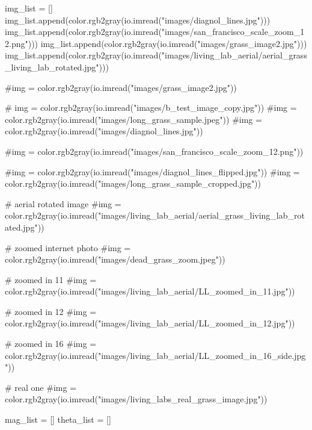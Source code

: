 \documentclass[
  letterpaper,
]{report}
\newenvironment{Shaded}{\begin{snugshade}}{\end{snugshade}}
\newcommand{\CommentTok}[1]{\textcolor[rgb]{0.37,0.37,0.37}{#1}}
\newcommand{\NormalTok}[1]{\textcolor[rgb]{0.00,0.23,0.31}{#1}}
\newcommand{\OperatorTok}[1]{\textcolor[rgb]{0.37,0.37,0.37}{#1}}
\newcommand{\StringTok}[1]{\textcolor[rgb]{0.13,0.47,0.30}{#1}}
\begin{document}
\begin{Shaded}
\begin{Highlighting}[]
\NormalTok{img\_list }\OperatorTok{=}\NormalTok{ []}
\NormalTok{img\_list.append(color.rgb2gray(io.imread(}\StringTok{"images/diagnol\_lines.jpg"}\NormalTok{)))}
\NormalTok{img\_list.append(color.rgb2gray(io.imread(}\StringTok{"images/san\_francisco\_scale\_zoom\_12.png"}\NormalTok{)))}
\NormalTok{img\_list.append(color.rgb2gray(io.imread(}\StringTok{"images/grass\_image2.jpg"}\NormalTok{)))}
\NormalTok{img\_list.append(color.rgb2gray(io.imread(}\StringTok{"images/living\_lab\_aerial/aerial\_grass\_living\_lab\_rotated.jpg"}\NormalTok{)))}

\CommentTok{\#img = color.rgb2gray(io.imread("images/grass\_image2.jpg"))}

\CommentTok{\# img = color.rgb2gray(io.imread("images/b\_test\_image\_copy.jpg"))}
\CommentTok{\#img = color.rgb2gray(io.imread("images/long\_grass\_sample.jpeg"))}
\CommentTok{\#img = color.rgb2gray(io.imread("images/diagnol\_lines.jpg"))}

\CommentTok{\#img = color.rgb2gray(io.imread("images/san\_francisco\_scale\_zoom\_12.png"))}

\CommentTok{\#img = color.rgb2gray(io.imread("images/diagnol\_lines\_flipped.jpg"))}
\CommentTok{\#img = color.rgb2gray(io.imread("images/long\_grass\_sample\_cropped.jpg"))}

\CommentTok{\# aerial rotated image}
\CommentTok{\#img = color.rgb2gray(io.imread("images/living\_lab\_aerial/aerial\_grass\_living\_lab\_rotated.jpg"))}

\CommentTok{\# zoomed internet photo}
\CommentTok{\#img = color.rgb2gray(io.imread("images/dead\_grass\_zoom.jpeg"))}


\CommentTok{\# zoomed in 11}
\CommentTok{\#img = color.rgb2gray(io.imread("images/living\_lab\_aerial/LL\_zoomed\_in\_11.jpg"))}

\CommentTok{\# zoomed in 12}
\CommentTok{\#img = color.rgb2gray(io.imread("images/living\_lab\_aerial/LL\_zoomed\_in\_12.jpg"))}

\CommentTok{\# zoomed in 16}
\CommentTok{\#img = color.rgb2gray(io.imread("images/living\_lab\_aerial/LL\_zoomed\_in\_16\_side.jpg"))}



\CommentTok{\# real one}
\CommentTok{\#img = color.rgb2gray(io.imread("images/living\_labs\_real\_grass\_image.jpg"))}

\NormalTok{mag\_list }\OperatorTok{=}\NormalTok{ []}
\NormalTok{theta\_list }\OperatorTok{=}\NormalTok{ []}



\end{Highlighting}
\end{Shaded}
\end{document}
